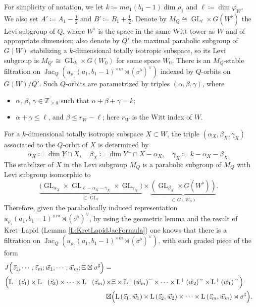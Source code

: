 \documentclass[11pt,letterpaper]{amsart}
\theoremstyle{plain}
\numberwithin{theorem}{section}
\numberwithin{equation}{subsection}
\theoremstyle{remark}
\newcommand{\GL}{\operatorname{GL}}
\newcommand{\Jac}{\operatorname{Jac}}
\newcommand{\Z}{\mathbb{Z}}
\begin{document}
\vskip 5pt

For simplicity of notation, we let $k\coloneqq m a_1\left(b_1-1\right)\dim\rho_1$ and $\ell\coloneqq \dim\varphi_W$. We also set $A'\coloneqq A_1-\frac{1}{2}$ and $B'\coloneqq B_1+\frac{1}{2}$.
Denote by $M_Q\cong \GL_\ell\times G\left(W^\flat\right)$ the Levi subgroup of $Q$, where $W^\flat$ is the space in the same Witt tower as $W$ and of appropriate dimension; also denote by $Q'$ the maximal parabolic subgroup of $G\left(W\right)$ stabilizing a $k$-dimensional totally isotropic subspace, so its Levi subgroup is $M_{Q'}\cong \GL_k\times G\left(W_0\right)$ for some space $W_0$. There is an $M_Q$-stable filtration on $\Jac_Q\left(u_{\rho_1}\left(a_1,b_1-1\right)^{\times m}\rtimes \left(\sigma^\flat\right)^\vee\right)$ indexed by $Q$-orbits on $G\left(W\right)/Q'$. Such $Q$-orbits are parametrized by triples $\left(\alpha,\beta,\gamma\right)$, where
\begin{itemize}
    \item $\alpha$, $\beta$, $\gamma\in\Z_{\geq 0}$ such that $\alpha+\beta+\gamma=k$;

    \vskip 5pt

    \item $\alpha+\gamma\leq \ell$, and $\beta\leq r_W-\ell$; here $r_W$ is the Witt index of $W$.
\end{itemize}
\vskip 5pt
For a $k$-dimensional totally isotropic subspace $X\subset W$, the triple $\left(\alpha_X,\beta_X,\gamma_X\right)$ associated to the $Q$-orbit of $X$ is determined by
\[
    \alpha_X \coloneqq \dim Y\cap X, \quad \beta_X\coloneqq \dim Y^\perp\cap X - \alpha_X, \quad \gamma_X\coloneqq k-\alpha_X-\beta_X.
\]
The stabilizer of $X$ in the Levi subgroup $M_Q$ is a parabolic subgroup of $M_Q$ with Levi subgroup isomorphic to
\[
    \underbrace{\Big(\GL_{\alpha_X}\times\GL_{\ell-\alpha_X-\gamma_X}\times\GL_{\gamma_X}\Big)}_{\subset \GL_\ell} \times \underbrace{\left(\GL_{\beta_X}\times G\left(W^\flat\right)\right)}_{\subset G\left(W_0\right)}.
\]
Therefore, given the parabolically induced representation $u_{\rho_1}\left(a_1,b_1-1\right)^{\times m}\rtimes \left(\sigma^\flat\right)^\vee$, by using the geometric lemma and the result of Kret--Lapid (Lemma \ref{L:KretLapidJacFormula}) one knows that there is a filtration on $\Jac_Q\left(u_{\rho_1}\left(a_1,b_1-1\right)^{\times m}\rtimes \left(\sigma^\flat\right)^\vee\right)$, with each graded piece of the form
\begin{align*}
        J\Big(\vec{z}_1,\cdots,\vec{z}_m;\vec{w}_1,\cdots,\vec{w}_m;\Xi\boxtimes\sigma^\sharp\Big)=&\\
    \Big({\rm L}^-\left(\vec{z}_1\right)\times{\rm L}^-\left(\vec{z}_2\right)\times\cdots\times {\rm L}^-\left(\vec{z}_m\right)\times &\Xi \times {\rm L}^+\left(\vec{w}_m\right)^\sim\times\cdots\times{\rm L}^+\left(\vec{w}_2\right)^\sim\times{\rm L}^+\left(\vec{w}_1\right)^\sim\Big)\\
    \boxtimes&\Big({\rm L}\left(\vec{z}_1,\vec{w}_1\right)\times{\rm L}\left(\vec{z}_2,\vec{w}_2\right)\times\cdots\times {\rm L}\left(\vec{z}_m,\vec{w}_m\right)\rtimes \sigma^\sharp\Big).
\end{align*}
\end{document}
